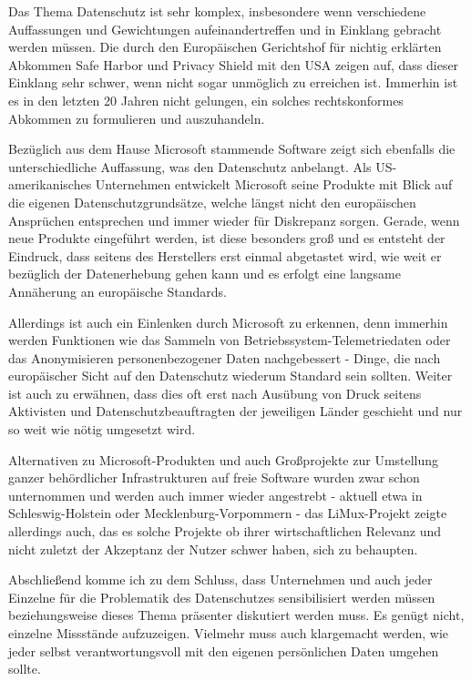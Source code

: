 Das Thema Datenschutz ist sehr komplex, insbesondere wenn verschiedene Auffassungen und Gewichtungen aufeinandertreffen und in Einklang gebracht werden müssen. Die durch den Europäischen Gerichtshof für nichtig erklärten Abkommen \glqq Safe Harbor\grqq{} und \glqq Privacy Shield\grqq{} mit den USA zeigen auf, dass dieser Einklang sehr schwer, wenn nicht sogar unmöglich zu erreichen ist. Immerhin ist es in den letzten 20 Jahren nicht gelungen, ein solches rechtskonformes Abkommen zu formulieren und auszuhandeln.

Bezüglich aus dem Hause Microsoft stammende Software zeigt sich ebenfalls die unterschiedliche Auffassung, was den Datenschutz anbelangt. Als US-amerikanisches Unternehmen entwickelt Microsoft seine Produkte mit Blick auf die eigenen Datenschutzgrundsätze, welche längst nicht den europäischen Ansprüchen entsprechen und immer wieder für Diskrepanz sorgen. Gerade, wenn neue Produkte eingeführt werden, ist diese besonders groß und es entsteht der Eindruck, dass seitens des Herstellers erst einmal abgetastet wird, wie weit er bezüglich der Datenerhebung gehen kann und es erfolgt eine langsame Annäherung an europäische Standards.

Allerdings ist auch ein Einlenken durch Microsoft zu erkennen, denn immerhin werden Funktionen wie das Sammeln von Betriebssystem-Telemetriedaten oder das Anonymisieren personenbezogener Daten nachgebessert - Dinge, die nach europäischer Sicht auf den Datenschutz wiederum Standard sein sollten. Weiter ist auch zu erwähnen, dass dies oft erst nach Ausübung von Druck seitens Aktivisten und Datenschutzbeauftragten der jeweiligen Länder geschieht und nur so weit wie nötig umgesetzt wird.

Alternativen zu Microsoft-Produkten und auch Großprojekte zur Umstellung ganzer behördlicher Infrastrukturen auf freie Software wurden zwar schon unternommen und werden auch immer wieder angestrebt - aktuell etwa in Schleswig-Holstein oder Mecklenburg-Vorpommern - das LiMux-Projekt zeigte allerdings auch, das es solche Projekte ob ihrer wirtschaftlichen Relevanz und nicht zuletzt der Akzeptanz der Nutzer schwer haben, sich zu behaupten.

Abschließend komme ich zu dem Schluss, dass Unternehmen und auch jeder Einzelne für die Problematik des Datenschutzes sensibilisiert werden müssen beziehungsweise dieses Thema präsenter diskutiert werden muss. Es genügt nicht, einzelne Missstände aufzuzeigen. Vielmehr muss auch klargemacht werden, wie jeder selbst verantwortungsvoll mit den eigenen persönlichen Daten umgehen sollte.
\\